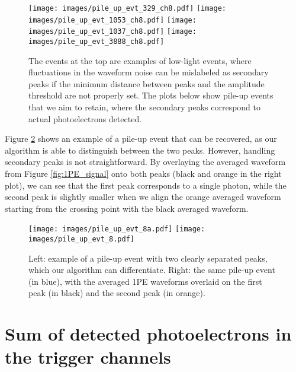 \documentclass[11pt,a4paper,english,oneside, pdf]{article}
\begin{document}
	\begin{figure}[!h]
		\begin{center}
			\texttt{[image: images/pile\_up\_evt\_329\_ch8.pdf]}
			\texttt{[image: images/pile\_up\_evt\_1053\_ch8.pdf]}
			\texttt{[image: images/pile\_up\_evt\_1037\_ch8.pdf]}
			\texttt{[image: images/pile\_up\_evt\_3888\_ch8.pdf]}
			\caption{The events at the top are examples of low-light events, where fluctuations in the waveform noise can be mislabeled as secondary peaks if the minimum distance between peaks and the amplitude threshold are not properly set. The plots below show pile-up events that we aim to retain, where the secondary peaks correspond to actual photoelectrons detected.}
			\label{fig:pile_up_evts}
		\end{center}
	\end{figure}
	
	
	
	Figure \ref{fig:pile_up} shows an example of a pile-up event that can be recovered, as our algorithm is able to distinguish between the two peaks. However, handling secondary peaks is not straightforward. By overlaying the averaged waveform from Figure \ref{fig:1PE_signal} onto both peaks (black and orange in the right plot), we can see that the first peak corresponds to a single photon, while the second peak is slightly smaller when we align the orange averaged waveform starting from the crossing point with the black averaged waveform.
	
	
	\begin{figure}[!h]
		\begin{center}
			\texttt{[image: images/pile\_up\_evt\_8a.pdf]}
			\texttt{[image: images/pile\_up\_evt\_8.pdf]}
			\caption{Left: example of a pile-up event with two clearly separated peaks, which our algorithm can differentiate. Right: the same pile-up event (in blue), with the averaged 1PE waveforms overlaid on the first peak (in black) and the second peak (in orange).}
			\label{fig:pile_up}
		\end{center}
	\end{figure}
	
	
	
	\clearpage
	
	\section{Sum of detected photoelectrons in the trigger channels}
	
\end{document}
